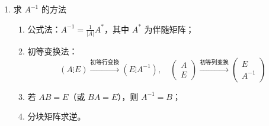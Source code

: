 \documentclass[UTF8]{ctexart}
\theoremstyle{remark}
\begin{document}
\begin{enumerate}
\item 求 \(A^{-1}\) 的方法  
\begin{enumerate}
	\item 公式法：\(A^{-1} = \frac{1}{|A|}A^*\)，其中 \(A^*\) 为伴随矩阵；  
	\item 初等变换法：  
	\[
	(A \vdots E) \xrightarrow{初等行变换} (E \vdots A^{-1}), \quad \left(\begin{array}{c} A \\ \hline E \end{array}\right) \xrightarrow{初等列变换} \left(\begin{array}{c} E \\ \hline A^{-1} \end{array}\right)
	\]  
	\item 若 \(AB = E\)（或 \(BA = E\)），则 \(A^{-1} = B\)；  
	\item 分块矩阵求逆。  
\end{enumerate}  


\end{enumerate}
\end{document}
